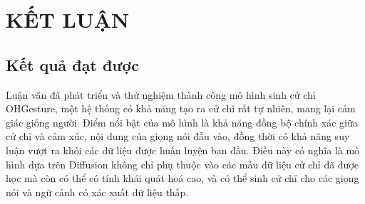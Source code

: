 \chapter{KẾT LUẬN}
\label{Chapter5}

\section{Kết quả đạt được}

%
%

Luận văn đã phát triển và thử nghiệm thành công mô hình sinh cử chỉ OHGesture, một hệ thống có khả năng tạo ra cử chỉ rất tự nhiên, mang lại cảm giác giống người. Điểm nổi bật của mô hình là khả năng đồng bộ chính xác giữa cử chỉ và cảm xúc, nội dung của giọng nói đầu vào, đồng thời có khả năng suy luận vượt ra khỏi các dữ liệu được huấn luyện ban đầu. Điều này có nghĩa là mô hình dựa trên Diffusion không chỉ phụ thuộc vào các mẫu dữ liệu cử chỉ đã được học mà còn có thể có tính khái quát hoá cao, và có thể sinh cử chỉ cho các giọng nói và ngữ cảnh có xác xuất dữ liệu thấp.


